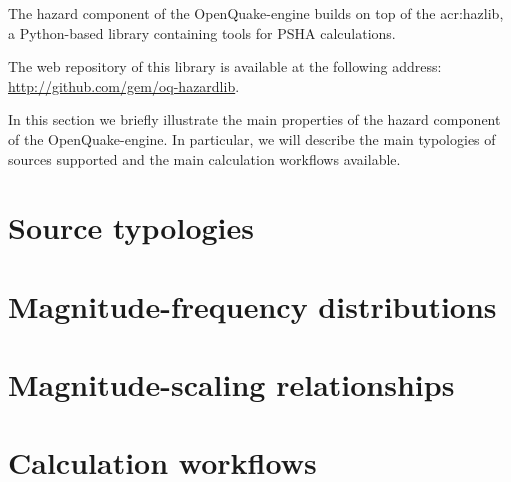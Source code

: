 
The hazard component of the OpenQuake-engine builds on top of the
\gls{acr:hazlib}, a Python-based library containing tools for PSHA
calculations.

The web repository of this library is available at the following address:\\
\href{http://github.com/gem/oq-hazardlib}{http://github.com/gem/oq-hazardlib}.

In this section we briefly illustrate the main properties of the hazard
component of the OpenQuake-engine. In particular, we will describe the main
typologies of sources supported and the main calculation workflows available.


\section{Source typologies}
\label{sec:source_typologies}


\section{Magnitude-frequency distributions}
\label{sec:mfd_list}


\section{Magnitude-scaling relationships}
\label{sec:msr_list}


\section{Calculation workflows}
\label{sec:hazard_calculators}
